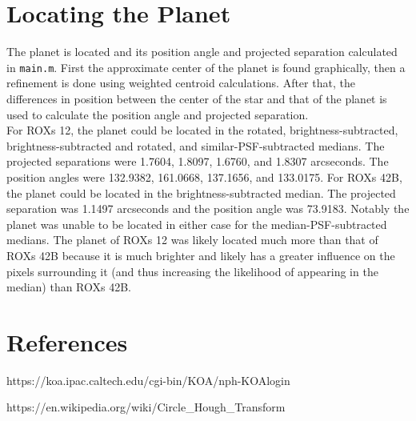 \documentclass[12pt]{article}
\begin{document}
\section{Locating the Planet}
The planet is located and its position angle and projected separation calculated in \texttt{main.m}. First the approximate center of the planet is found graphically, then a refinement is done using weighted centroid calculations. After that, the differences in position between the center of the star and that of the planet is used to calculate the position angle and projected separation.\\
\indent For ROXs 12, the planet could be located in the rotated, brightness-subtracted, brightness-subtracted and rotated, and similar-PSF-subtracted medians. The projected separations were 1.7604, 1.8097, 1.6760, and 1.8307 arcseconds. The position angles were 132.9382\degree, 161.0668\degree, 137.1656\degree, and 133.0175\degree. For ROXs 42B, the planet could be located in the brightness-subtracted median. The projected separation was 1.1497 arcseconds and the position angle was 73.9183\degree. Notably the planet was unable to be located in either case for the median-PSF-subtracted medians. The planet of ROXs 12 was likely located much more than that of ROXs 42B because it is much brighter and likely has a greater influence on the pixels surrounding it (and thus increasing the likelihood of appearing in the median) than ROXs 42B.


\section*{References}
\begin{mylist}
\item https://koa.ipac.caltech.edu/cgi-bin/KOA/nph-KOAlogin
\item https://en.wikipedia.org/wiki/Circle\_Hough\_Transform
\end{mylist}

\newpage
\end{document}

